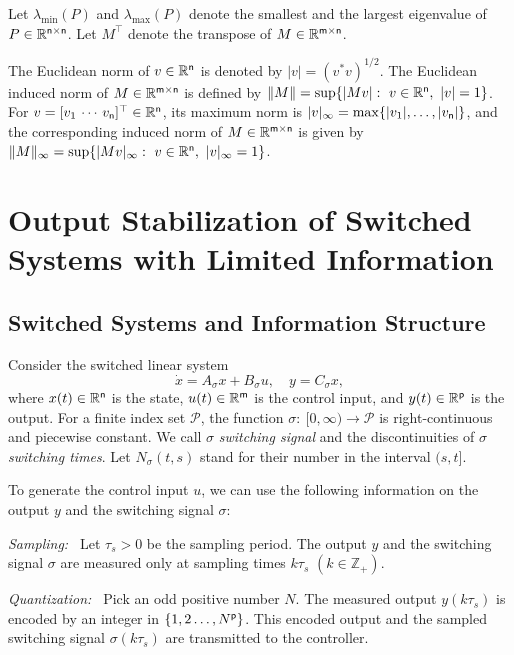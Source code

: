 \documentclass[letterpaper, 11pt, onecolumn]{ieeeconf}  \IEEEoverridecommandlockouts
\begin{document}
Let $\lambda_{\min}(P)$ and $\lambda_{\max}(P)$ denote 
the smallest and the largest eigenvalue of $P \in \mathbb{R}^{\sf n\times n}$.
Let $M^{\top}$ denote the transpose of $M \in \mathbb{R}^{\sf m\times n}$.

The Euclidean norm of $v \in \mathbb{R}^{\sf n}$ is
denoted by $|v| = (v^*v)^{1/2}$. 
The Euclidean induced norm of $M \in \mathbb{R}^{\sf m\times n}$ is defined by
$\|M\| = \sup \{  |Mv |:~v\in \mathbb{R}^{\sf n},~|v|= 1 \}$.
For $v = [v_1~\!\dotsb ~\!v_{\sf n} ]^{\top} \in \mathbb{R}^{\sf n}$,
its maximum norm is $|v|_{\infty} = \max\{|v_1|,\dots, |v_{\sf n}|\}$, and
the corresponding induced norm of $M \in \mathbb{R}^{\sf m\times n}$ is given by
$\|M\|_{\infty} = \sup \{  |Mv |_{\infty}:~
v\in \mathbb{R}^{\sf n},~|v|_{\infty}= 1 \}$.



\section{Output Stabilization of Switched Systems with
Limited Information}
\subsection{Switched Systems and Information Structure}
Consider the switched linear system
\begin{equation}
\label{eq:SLS}
\dot x = A_{\sigma}x+B_{\sigma}u,\quad y = C_{\sigma}x,
\end{equation}
where $x(t) \in \mathbb{R}^{\sf{n}}$ is the state,
$u(t) \in \mathbb{R}^{\sf{m}}$ is the control input, and
$y(t) \in \mathbb{R}^{\sf{p}}$ is the output.
For a finite index set $\mathcal{P}$,
the function $\sigma :~[0,\infty) \to \mathcal{P}$ is right-continuous and
piecewise constant.
We call $\sigma$ {\em switching signal} and
the discontinuities of $\sigma$ {\em switching times}.
Let $N_{\sigma}(t,s)$ stand for their number in the interval $(s,t]$. 


To generate the control input $u$, we can use
the following information on the output $y$ and the switching signal $\sigma$:

{\sl Sampling:~}
Let $\tau_s>0$ be the sampling period.
The output $y$ and the switching signal $\sigma$ are measured only at
sampling times
$k\tau_s$ $(k \in \mathbb{Z}_+)$.

{\sl Quantization:~}
Pick an odd positive number $N$.
The measured output $y(k\tau_s)$ is encoded by an integer in
$\{ 1,2\dots,N^{\sf{p}} \}$.
This encoded output and the sampled switching signal $\sigma(k\tau_s)$
are transmitted to the controller.
\end{document}
